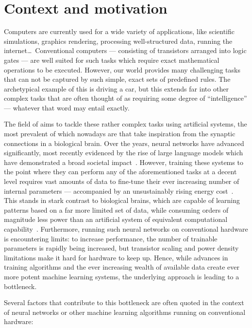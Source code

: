 \section{Context and motivation}\label{sec:1:Context}
Computers are currently used for a wide variety of applications, like scientific simulations, graphics rendering, processing well-structured data, running the internet\dots\,
Conventional computers --- consisting of transistors arranged into logic gates --- are well suited for such tasks which require exact mathematical operations to be executed.
However, our world provides many challenging tasks that can not be captured by such simple, exact sets of predefined rules.
The archetypical example of this is driving a car, but this extends far into other complex tasks that are often thought of as requiring some degree of ``intelligence'' --- whatever that word may entail exactly. \par
The field of  aims to tackle these rather complex tasks using artificial systems, the most prevalent of which nowadays are  that take inspiration from the synaptic connections in a biological brain.
Over the years, neural networks have advanced significantly, most recently evidenced by the rise of large language models which have demonstrated a broad societal impact~\cite{ImprovingLanguageGPT,GPT-4}.
However, training these systems to the point where they can perform any of the aforementioned tasks at a decent level requires vast amounts of data to fine-tune their ever increasing number of internal parameters --- accompanied by an unsustainably rising energy cost~\cite{QuantumNeuromorphicOpportunities,BLOOM_CarbonFootprint_176Bparam}.
This stands in stark contrast to biological brains, which are capable of learning patterns based on a far more limited set of data, while consuming orders of magnitude less power than an artificial system of equivalent computational capability~\cite{NeuromorphicSpintronics}.
Furthermore, running such neural networks on conventional hardware is encountering limits: to increase performance, the number of trainable parameters is rapidly being increased, but transistor scaling and power density limitations make it hard for hardware to keep up.
Hence, while advances in training algorithms and the ever increasing wealth of available data create ever more potent machine learning systems, the underlying approach is leading to a bottleneck. \par
Several factors that contribute to this bottleneck are often quoted in the context of neural networks or other machine learning algorithms running on conventional hardware:
